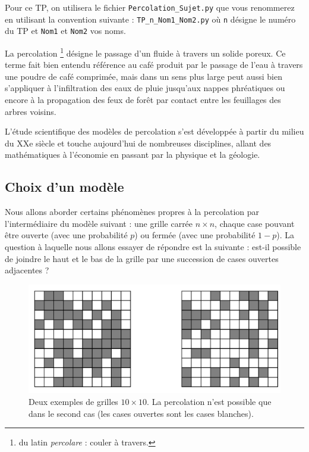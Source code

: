 \documentclass[t,10pt]{article}
\begin{document}
\enteteinfo

\graphicspath{{images}}

\setcounter{numques}{0}

Pour ce TP, on utilisera le fichier \texttt{Percolation\_Sujet.py} que vous renommerez en utilisant la convention suivante : 
\texttt{TP\_n\_Nom1\_Nom2.py} où \texttt{n} désigne le numéro du TP et \texttt{Nom1} et \texttt{Nom2} vos noms.

La percolation \footnote{du latin \emph{percolare} : couler à travers.} désigne le passage d'un fluide à
travers un solide poreux. Ce terme fait bien entendu référence au café
produit par le passage de l'eau à travers une poudre de café comprimée,
mais dans un sens plus large peut aussi bien s'appliquer à
l'infiltration des eaux de pluie jusqu'aux nappes phréatiques ou encore
à la propagation des feux de forêt par contact entre les feuillages des
arbres voisins.

L'étude scientifique des modèles de percolation s'est développée à
partir du milieu du XXe siècle et touche aujourd'hui de nombreuses
disciplines, allant des mathématiques à l'économie en passant par la
physique et la géologie.

\subsection*{Choix d'un modèle}\label{choix-dun-modele}


Nous allons aborder certains phénomènes propres à la percolation par
l'intermédiaire du modèle suivant : une grille carrée $n\times n$,
chaque case pouvant être ouverte (avec une probabilité $p$) ou
fermée (avec une probabilité $1-p$). La question à laquelle nous
allons essayer de répondre est la suivante : est-il possible de joindre
le haut et le bas de la grille par une succession de cases ouvertes
adjacentes ?

\begin{figure}[H]
\begin{center}
\includegraphics[width=\linewidth]{illustration_perco.jpg}
\caption{Deux exemples de grilles $10\times10$. La percolation
n'est possible que dans le second cas (les cases ouvertes sont les cases
blanches). \label{fig1}}
\end{center}
\end{figure}
\end{document}
